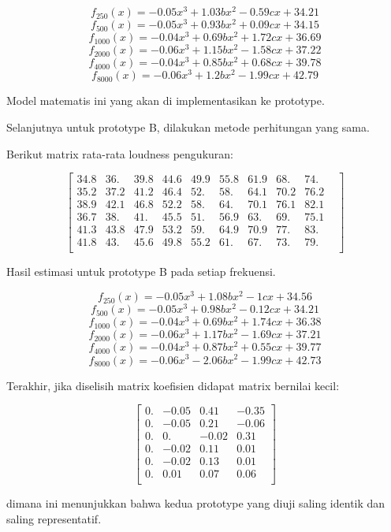 \documentclass[12pt,]{article}
\begin{document}
\begin{itemize}
		\[f_{250}(x) = -0.05x^3 + 1.03bx^2 - 0.59cx + 34.21\]
		\[f_{500}(x) = -0.05x^3 + 0.93bx^2 + 0.09cx + 34.15\]
		\[f_{1000}(x) = -0.04x^3 + 0.69bx^2 + 1.72cx + 36.69\]
		\[f_{2000}(x) = -0.06x^3 + 1.15bx^2 - 1.58cx + 37.22\]
		\[f_{4000}(x) = -0.04x^3 + 0.85bx^2 + 0.68cx + 39.78\]
		\[f_{8000}(x) = -0.06x^3 + 1.2bx^2 - 1.99cx + 42.79\]
		
		Model matematis ini yang akan di implementasikan ke prototype.
		
		\newpage 
		Selanjutnya untuk prototype B, dilakukan metode perhitungan yang sama.
		
		Berikut matrix rata-rata loudness pengukuran:
		
		\[\left[
		\begin{matrix}
			34.8&36.&39.8&44.6&49.9&55.8&61.9&68.&74.&\\

			35.2&37.2&41.2&46.4&52.&58.&64.1&70.2&76.2\\

			38.9&42.1&46.8&52.2&58.&64.&70.1&76.1&82.1\\

			36.7&38.&41.&45.5&51.&56.9&63.&69.&75.1\\

			41.3&43.8&47.9&53.2&59.&64.9&70.9&77.&83.&\\

			41.8&43.&45.6&49.8&55.2&61.&67.&73.&79.&\\
		\end{matrix}
		\right]\]
		
		Hasil estimasi untuk prototype B pada setiap frekuensi.
		
		\[f_{250}(x) = -0.05x^3 + 1.08bx^2 - 1cx + 34.56\]
		\[f_{500}(x) = -0.05x^3 + 0.98bx^2 - 0.12cx + 34.21\]
		\[f_{1000}(x) = -0.04x^3 + 0.69bx^2 + 1.74cx + 36.38\]
		\[f_{2000}(x) = -0.06x^3 + 1.17bx^2 - 1.69cx + 37.21\]
		\[f_{4000}(x) = -0.04x^3 + 0.87bx^2 + 0.55cx + 39.77\]
		\[f_{8000}(x) = -0.06x^3 - 2.06bx^2 - 1.99cx + 42.73\]
		
		Terakhir, jika diselisih matrix koefisien didapat matrix bernilai kecil:
		
		\[\left[
		\begin{matrix}
			0.  & -0.05 &  0.41 & -0.35\\
			0.  & -0.05 &  0.21 & -0.06\\
			0.  &  0.   & -0.02 &  0.31\\
			0.  & -0.02 &  0.11 &  0.01\\
			0.  & -0.02 &  0.13 &  0.01\\
			0.  &  0.01 &  0.07 &  0.06\\
		\end{matrix}
		\right]\]
		
		dimana ini menunjukkan bahwa kedua prototype yang diuji saling identik dan saling representatif.
	\end{itemize}
\end{document}
